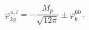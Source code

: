 \begin{equation}\label{phikp}
\varphi_{kp}^{u,l}=-\frac{M_{p}}{\sqrt{12
\pi}}\pm\varphi_{b}^{60} \, .
\end{equation}

